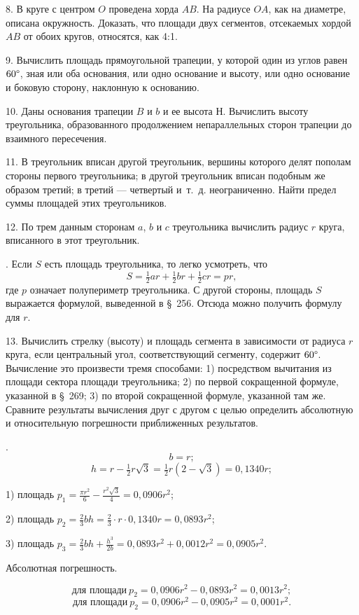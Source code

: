 \documentclass[oneside]{book}
\begin{document}
8.
В круге с центром $O$ проведена хорда $AB$.
На радиусе $OA$, как на диаметре, описана окружность.
Доказать, что площади двух сегментов, отсекаемых хордой $AB$ от обоих кругов, относятся, как 4:1.


9.
Вычислить площадь прямоугольной трапеции, у которой один из углов равен $60\degree$, зная или оба основания, или одно основание и высоту, или одно основание и боковую сторону, наклонную к основанию.

10.
Даны основания трапеции $B$ и $b$ и ее высота Н.
Вычислить высоту треугольника, образованного продолжением непараллельных сторон трапеции до взаимного пересечения.

11.
В треугольник вписан другой треугольник, вершины которого делят пополам стороны первого треугольника;
в другой треугольник вписан подобным же образом третий;
в третий — четвертый и~т.~д.
неограниченно.
Найти предел суммы площадей этих треугольников.

12.
По трем данным сторонам $a$, $b$ и $c$ треугольника вычислить радиус $r$ круга, вписанного в этот треугольник.

.
Если $S$ есть площадь треугольника, то легко усмотреть, что
\[S=\tfrac12 ar+\tfrac12 br+\tfrac12 cr=pr,\]
где $p$ означает полупериметр треугольника.
С другой стороны, площадь $S$ выражается формулой, выведенной в §~256.
Отсюда можно получить формулу для $r$.


13.
Вычислить стрелку (высоту) и площадь сегмента в зависимости от радиуса $r$ круга, если центральный угол, соответствующий сегменту, содержит $60\degree$.
Вычисление это произвести тремя способами:
1) посредством вычитания из площади сектора площади треугольника;
2) по первой сокращенной формуле, указанной в §~269;
3) по второй сокращенной формуле, указанной там же.
Сравните результаты вычисления друг с другом с целью определить абсолютную и относительную погрешности приближенных результатов.

.
\[b=r;\]
\[h=r-\tfrac12 r\sqrt3=\tfrac12 r(2-\sqrt3)=0{,}1340r;\]

1) площадь $p_1=\frac{\pi r^2}{6}-\frac{r^2\sqrt3}{4}=0{,}0906r^2$;

2) площадь $p_2=\tfrac23 bh=\tfrac23\cdot r\cdot 0{,}1340r=0{,}0893r^2$;

3) площадь $p_3=\tfrac23 bh+\frac{h^3}{2b}=0{,}0893r^2+0{,}0012r^2=0{,}0905r^2$.

Абсолютная погрешность.

\[\text{для площади}~p_2 = 0{,}0906r^2 - 0{,}0893r^2 = 0,0013r^2;\]
\[\text{для площади}~p_2 = 0{,}0906r^2 - 0{,}0905r^2 = 0,0001r^2.\]
\end{document}
